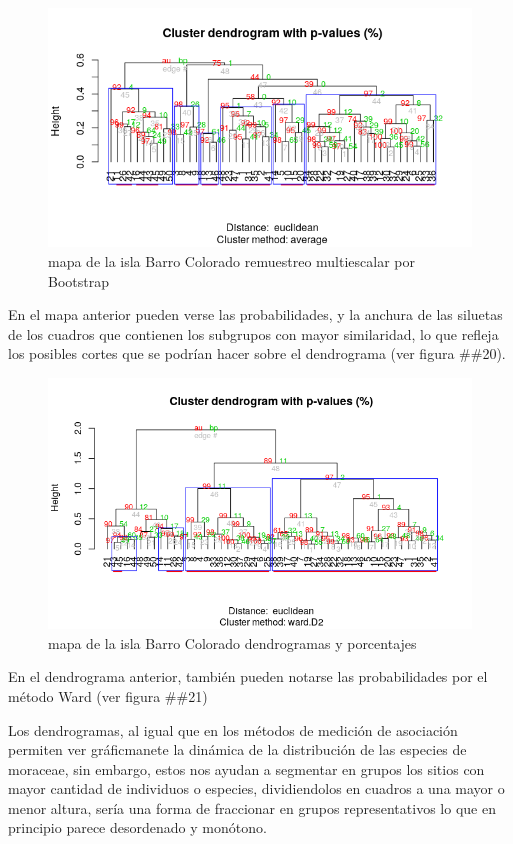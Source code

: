 \documentclass[11pt,]{article}
\begin{document}
\begin{figure}
\centering
\includegraphics[width=1.00000\textwidth]{multiescalar_bootstrap.png}
\caption{mapa de la isla Barro Colorado remuestreo multiescalar por
Bootstrap \label{fig:bci_map}}
\end{figure}

En el mapa anterior pueden verse las probabilidades, y la anchura de las
siluetas de los cuadros que contienen los subgrupos con mayor
similaridad, lo que refleja los posibles cortes que se podrían hacer
sobre el dendrograma (ver figura \#\#20).

\begin{figure}
\centering
\includegraphics[width=1.00000\textwidth]{agrupamiento_dendrogramas_porcentajes.png}
\caption{mapa de la isla Barro Colorado dendrogramas y porcentajes
\label{fig:bci_map}}
\end{figure}

En el dendrograma anterior, también pueden notarse las probabilidades
por el método Ward (ver figura \#\#21)

Los dendrogramas, al igual que en los métodos de medición de asociación
permiten ver gráficmanete la dinámica de la distribución de las especies
de moraceae, sin embargo, estos nos ayudan a segmentar en grupos los
sitios con mayor cantidad de individuos o especies, dividiendolos en
cuadros a una mayor o menor altura, sería una forma de fraccionar en
grupos representativos lo que en principio parece desordenado y
monótono.
\end{document}

